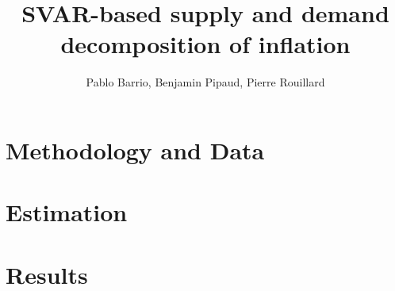 \documentclass[letterpaper,12pt,leqno]{article}
\begin{document}
\title{SVAR-based supply and demand decomposition of inflation}
\author{Pablo Barrio, Benjamin Pipaud, Pierre Rouillard}
\date{}

\begin{titlepage}
\maketitle
\tableofcontents
\end{titlepage}

\section{Methodology and Data}\label{sec:sec1}

\section{Estimation}\label{sec:sec2}

\section{Results}\label{sec:sec3}
\end{document}
